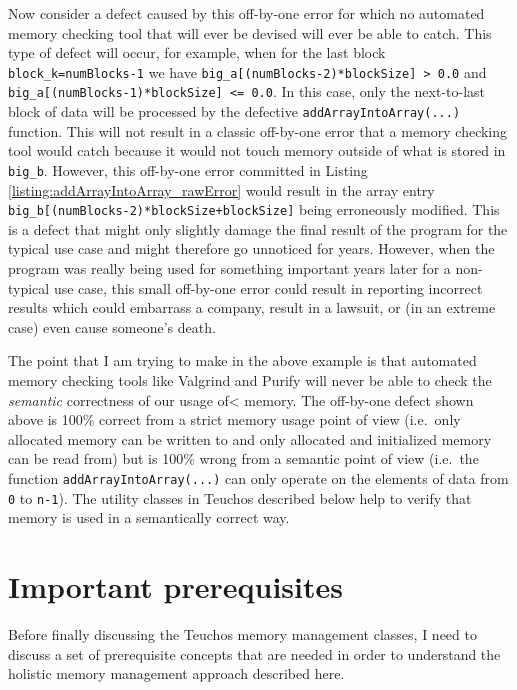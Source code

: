 \documentclass[pdf,ps2pdf,11pt]{SANDreport}
\begin{document}
Now consider a defect caused by this off-by-one error for which no
automated memory checking tool that will ever be devised will ever be
able to catch.  This type of defect will occur, for example, when for
the last block {}\texttt{block\_k=numBlocks-1} we have
{}\texttt{big\_a[(numBlocks-2)*blockSize] > 0.0} and
{}\texttt{big\_a[(numBlocks-1)*blockSize] <= 0.0}.  In this case, only
the next-to-last block of data will be processed by the defective
{}\texttt{addArrayIntoArray(...)} function.  This will not result in a
classic off-by-one error that a memory checking tool would catch
because it would not touch memory outside of what is stored in
{}\texttt{big\_b}.  However, this off-by-one error committed in Listing
{}\ref{listing:addArrayIntoArray_rawError} would result in the array
entry {}\texttt{big\_b[(numBlocks-2)*blockSize+blockSize]} being
erroneously modified.  This is a defect that might only slightly
damage the final result of the program for the typical use case and
might therefore go unnoticed for years.  However, when the program was
really being used for something important years later for a
non-typical use case, this small off-by-one error could result in
reporting incorrect results which could embarrass a company, result in
a lawsuit, or (in an extreme case) even cause someone's death.

The point that I am trying to make in the above example is that
automated memory checking tools like Valgrind and Purify will never be
able to check the {}\textit{semantic} correctness of our usage of<
memory.  The off-by-one defect shown above is 100\% correct from a
strict memory usage point of view (i.e.\ only allocated memory can be
written to and only allocated and initialized memory can be read from)
but is 100\% wrong from a semantic point of view (i.e.\ the function
{}\texttt{addArrayIntoArray(...)} can only operate on the elements of
data from {}\texttt{0} to {}\texttt{n-1}).  The utility classes in
Teuchos described below help to verify that memory is used in a
semantically correct way.


%
{}\section{Important prerequisites}
\label{sec:important-prerequisites}
%

Before finally discussing the Teuchos memory management classes, I
need to discuss a set of prerequisite concepts that are needed in
order to understand the holistic memory management approach described
here.
\end{document}
